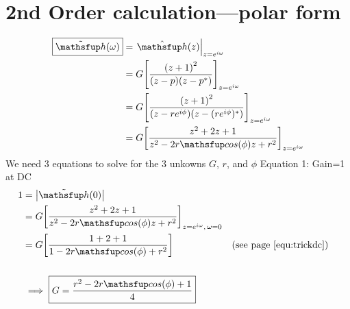 \section{2nd Order  calculation---polar form}
\mbox{}\vfill
{\begin{align*}
  \boxed{\Fh(\omega)}
    &= \brlr{\Zh(z)}_{z=e^{i\omega}}
  \\&= G\brs{\frac{\brp{z+1}^2}
                  {\brp{z-p}\brp{z-p^\ast}}}_{z=e^{i\omega}}
  \\&= G\brs{\frac{\brp{z+1}^2}
                  {\brp{z-re^{i\phi}}\brp{z-(re^{i\phi})^\ast}}}_{z=e^{i\omega}}
  \\&= G\brs{\frac{z^2 + 2z + 1}
                  {z^2 - 2r\cos(\phi)z + r^2}
            }_{z=e^{i\omega}}
\end{align*}}
\vfill
We need 3 equations to solve for the 3 unkowns $G$, $r$, and $\phi$
\vfill\mbox{}
\newpage
Equation 1: Gain=1 at DC
\vfill
\begin{align*}
  1 &= \abs{\Fh(0)}
  \\&= G\brs{\frac{z^2 + 2z            + 1}
                  {z^2 - 2r\cos(\phi)z + r^2}}_{z=e^{i\omega},\,\omega=0}
  \\&= G\brs{\frac{1   + 2             + 1}
                  {1   - 2r\cos(\phi)  + r^2}}
    && \text{(see \prefpo{equ:trickdc})}
  \\
  \\&\implies \boxed{G = \frac{r^2 - 2r\cos(\phi) + 1}{4}}
\end{align*}
\vfill\mbox{}


